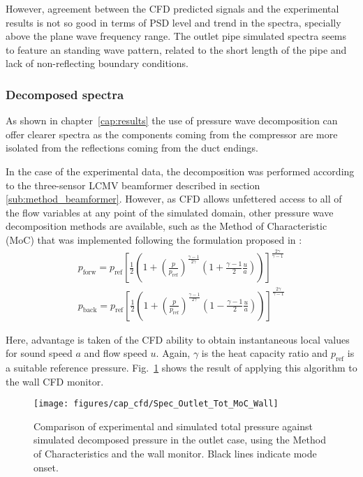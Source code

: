 However, agreement between the CFD predicted signals and the experimental results is not so good in terms of PSD level and trend in the spectra, specially above the plane wave frequency range. The outlet pipe simulated spectra seems to feature an standing wave pattern, related to the short length of the pipe and lack of non-reflecting boundary conditions.

\subsubsection{Decomposed spectra}

As shown in chapter~\ref{cap:results} the use of pressure wave decomposition can offer clearer spectra as the components coming from the compressor are more isolated from the reflections coming from the duct endings. 

In the case of the experimental data, the decomposition was performed according to the three-sensor LCMV beamformer described in section \ref{sub:method_beamformer}. However, as CFD allows unfettered access to all of the flow variables at any point of the simulated domain, other pressure wave decomposition methods are available, such as the Method of Characteristic (MoC) that was implemented following the formulation proposed in \cite{payri1995acoustic,torregrosa2012dev,galindo2010coupling}: 
\begin{eqnarray}\label{eq:descomposicion}
p_\text{forw}=p_\text{ref}\left[ \frac{1}{2}\left(1+\left(\frac{p}{p_\text{ref}}\right)^{\frac{\gamma-1}{2\gamma}}\left(1+\frac{\gamma-1}{2}\frac{u}{a}\right)\right) \right]^{\frac{2\gamma}{\gamma-1}}\\
p_\text{back}=p_\text{ref}\left[ \frac{1}{2}\left(1+\left(\frac{p}{p_\text{ref}}\right)^{\frac{\gamma-1}{2\gamma}}\left(1-\frac{\gamma-1}{2}\frac{u}{a}\right)\right) \right]^{\frac{2\gamma}{\gamma-1}}\nonumber
\end{eqnarray}

Here, advantage is taken of the CFD ability to obtain instantaneous local values for sound speed $a$ and flow speed $u$. Again, $\gamma$ is the heat capacity ratio and $p_\text{ref}$ is a suitable reference pressure. Fig.~\ref{fig:cfd_Spec_Outlet_Tot_Moc_Wall} shows the result of applying this algorithm to the wall CFD monitor.

\begin{figure}[htb!]
\centering
\texttt{[image: figures/cap\_cfd/Spec\_Outlet\_Tot\_MoC\_Wall]}
\caption[Comparison of decomposed CFD spectrum (wall)]{Comparison of experimental and simulated total pressure against simulated decomposed pressure in the outlet case, using the Method of Characteristics and the wall monitor. Black lines indicate mode onset.}
\label{fig:cfd_Spec_Outlet_Tot_Moc_Wall}
\end{figure}

